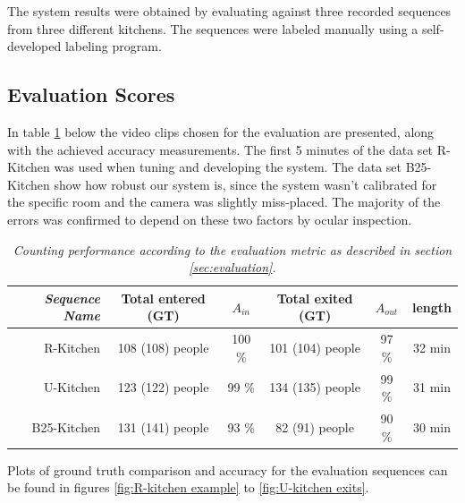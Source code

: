 The system results were obtained by evaluating against three recorded sequences from three different kitchens. The sequences were labeled manually using a self-developed labeling program.

\subsection{Evaluation Scores}
In table \ref{tab:evaluation_performance} below the video clips chosen for the evaluation are presented, along with the achieved accuracy measurements. The first 5 minutes of the data set R-Kitchen was used when tuning and developing the system. The data set B25-Kitchen show how robust our system is, since the system wasn't calibrated for the specific room and the camera was slightly miss-placed. The majority of the errors was confirmed to depend on these two factors by ocular inspection.

\begin{table}[h]
\centering
	\begin{tabular}{r | c | c | c | c | c  }
			\emph{Sequence Name}		&  Total entered (GT) & \emph{$A_{in}$} & Total exited (GT) & \emph{$A_{out}$} & length \\
			\hline \hline
			R-Kitchen			& 108 (108) people & 100 \% & 101 (104) people & 97 \% & 32 min\\
			U-Kitchen			& 123 (122) people & 99 \% & 134 (135) people & 99 \% & 31 min  \\
			B25-Kitchen			& 131 (141) people & 93 \% & 82 (91) people & 90 \% & 30 min \\
			\end{tabular}
	\caption[System performance]{\textit{Counting performance according to the evaluation metric as described in section \ref{sec:evaluation}.}}
	\label{tab:evaluation_performance}
\end{table}

Plots of ground truth comparison and accuracy for the evaluation sequences can be found in figures \ref{fig:R-kitchen example} to \ref{fig:U-kitchen exits}.
\newpage


